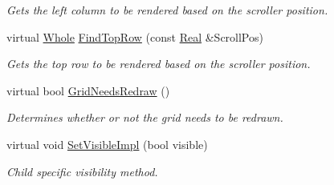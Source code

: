 \begin{DoxyCompactItemize}
\begin{DoxyCompactList}\small\item\em Gets the left column to be rendered based on the scroller position. \item\end{DoxyCompactList}\item 
\hypertarget{classMezzanine_1_1UI_1_1ScrolledCellGrid_a3f0287f5f10fa8195d118aa8ad7e6e49}{
virtual \hyperlink{namespaceMezzanine_adcbb6ce6d1eb4379d109e51171e2e493}{Whole} \hyperlink{classMezzanine_1_1UI_1_1ScrolledCellGrid_a3f0287f5f10fa8195d118aa8ad7e6e49}{FindTopRow} (const \hyperlink{namespaceMezzanine_a726731b1a7df72bf3583e4a97282c6f6}{Real} \&ScrollPos)}
\label{classMezzanine_1_1UI_1_1ScrolledCellGrid_a3f0287f5f10fa8195d118aa8ad7e6e49}

\begin{DoxyCompactList}\small\item\em Gets the top row to be rendered based on the scroller position. \item\end{DoxyCompactList}\item 
\hypertarget{classMezzanine_1_1UI_1_1ScrolledCellGrid_a1a02fe5ea7c7629e6419b71515d00e39}{
virtual bool \hyperlink{classMezzanine_1_1UI_1_1ScrolledCellGrid_a1a02fe5ea7c7629e6419b71515d00e39}{GridNeedsRedraw} ()}
\label{classMezzanine_1_1UI_1_1ScrolledCellGrid_a1a02fe5ea7c7629e6419b71515d00e39}

\begin{DoxyCompactList}\small\item\em Determines whether or not the grid needs to be redrawn. \item\end{DoxyCompactList}\item 
virtual void \hyperlink{classMezzanine_1_1UI_1_1ScrolledCellGrid_a259a2f007e7afc5b2fa967c02b0d5627}{SetVisibleImpl} (bool visible)
\begin{DoxyCompactList}\small\item\em Child specific visibility method. \item\end{DoxyCompactList}\end{DoxyCompactItemize}
